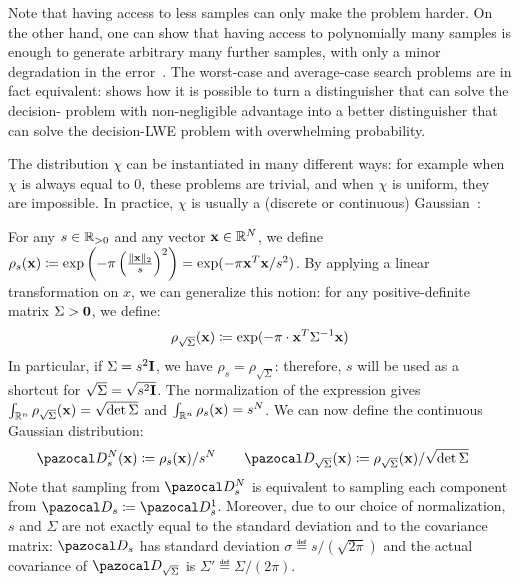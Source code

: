{  Note that having access to less samples can only make the problem harder. On the other hand, one can show that having access to polynomially many samples is enough to generate arbitrary many further samples,
  with only a minor degradation in the error~\cite{GCV_2008_Trapdoors,ACPS_2009_Fast_crypto_primitives_circular_secure_enc,APS_2015_Concrete_hardness_LWE}. The worst-case and average-case search problems are in fact equivalent: \cite[Lem.~4.1]{Regev2005} shows how it is possible to turn a distinguisher that can solve the decision-\LWE{} problem with non-negligible advantage into a better distinguisher that can solve the decision-LWE{} problem with overwhelming probability.

  The distribution $\chi$ can be instantiated in many different ways: for example when $\chi$ is always equal to $0$, these problems are trivial, and when $\chi$ is uniform, they are impossible. In practice, $\chi$ is usually a (discrete or continuous) Gaussian~:

  \begin{definition}
    For any $s \in \mathbb{R}_{>0}$ and any vector $\mathbf{x} \in \mathbb{R}^N$, we define $\rho_s(\mathbf{x}) \coloneqq \exp\left(- \pi \left(\frac{\|\mathbf{x}\|_2}{s}\right)^2\right) = \exp(- \pi \mathbf{x}^T \mathbf{x}/s^2)$. By applying a linear transformation on $x$, we can generalize this notion: for any positive-definite matrix $\Sigma > \mathbf{0}$, we define:
    \begin{align}
      \rho_{\sqrt{\Sigma}}(\mathbf{x}) \coloneqq \exp(- \pi \cdot \mathbf{x}^T \Sigma^{-1} \mathbf{x})
    \end{align}
    In particular, if $\Sigma = s^2 \mathbf{I}$, we have $\rho_s = \rho_{\sqrt{\Sigma}}$: therefore, $s$ will be used as a shortcut for $\sqrt{\Sigma} = \sqrt{s^2 \mathbf{I}}$. The normalization of the expression gives $\int_{\mathbb{R}^n} \rho_{\sqrt{\Sigma}}(\mathbf{x}) = \sqrt{\det \Sigma}$ and $\int_{\mathbb{R}^n} \rho_s(\mathbf{x}) = s^N$. We can now define the continuous Gaussian distribution:
    \begin{align}
      \cD_{s}^N(\vect{x}) \eqdef \rho_s(\vect{x})/s^N &\qquad \cD_{\sqrt{\Sigma}}(\vect{x}) \eqdef \rho_{\sqrt{\Sigma}}(\vect{x})/\sqrt{\det \Sigma}
    \end{align}
    Note that sampling from $\cD_s^N$ is equivalent to sampling each component from $\cD_s \eqdef \cD_s^1$. Moreover, due to our choice of normalization, $s$ and $\Sigma$ are not exactly equal to the standard deviation and to the covariance matrix: $\cD_s$ has standard deviation $\sigma \eqdef s/(\sqrt{2\pi})$ and the actual covariance of $\cD_{\sqrt{\Sigma}}$ is $\Sigma' \eqdef \Sigma/(2\pi)$.


\end{definition}}
